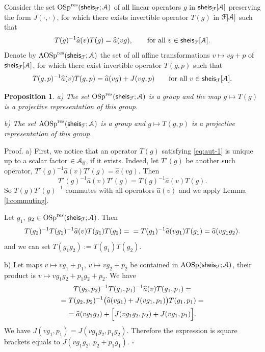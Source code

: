 \documentclass[]{amsart}
\newtheorem{proposition}[theorem]{Proposition}
\def\OSp{\mathrm {OSp}}
\def\cA{\EuScript A}
\def\cF{\EuScript F}
\def\ov{\overline}
\def\wh{\widehat}
\def\sm{\smallskip}
\def\0{{\ov 0}}
\def\sheis{\mathsf{sheis}}
\begin{document}
 Consider the set $\OSp^{\mathrm{res}}(\sheis_\cF;\cA)$ of all linear operators $g$ in $\sheis_\cF[\cA]$
 preserving the form $J(\cdot,\cdot)$, for which there exists 
 invertible operator $T(g)$ in $\cF[\cA]$ such that
 \begin{equation}
 T(g)^{-1}\wh a(v) T(g)= \wh a (vg), \qquad \text{for all $v\in \sheis_\cF[\cA]$.}
 \label{eq:aut-1}
 \end{equation}
 Denote by $\mathrm{AOSp}^{\mathrm{res}}(\sheis_\cF;\cA)$ the set of all
 affine transformations $v\mapsto vg+ p$ of $\sheis_\cF[\cA]$, for which
 there exist invertible operator $T(g,p)$ such that
 \begin{equation}
 T(g,p)^{-1} \wh a(v)  T(g,p)=\wh a(vg)+ J(vg, p)
  \qquad \text{for all $v\in \sheis_\cF[\cA]$.}
  \label{eq:aut-2}
\end{equation}
 
 \begin{proposition}
 {\rm a)}	The set
$\OSp^{\mathrm{res}}(\sheis_\cF;\cA)$ is a group and the map
$g\mapsto T(g)$ is a projective representation of this group.

\sm

{\rm b)} The set $\mathrm{AOSp}^{\mathrm{res}}(\sheis_\cF;\cA)$
is a group  and $g\mapsto T(g,p)$ is a projective representation
of this group.
\end{proposition}

{\sc Proof.} a) First, we notice that an operator $T(g)$ satisfying
\eqref{eq:aut-1} is unique up to a scalar
factor $\in\cA_\0$, if it exists. Indeed, let $T'(g)$
be another such operator, $ T'(g)^{-1}\wh a(v) T'(g)= \wh a (vg)$.
Then
$$
 T'(g)^{-1}\wh a(v) T'(g)=  T(g)^{-1}\wh a(v) T(g).
$$ 
So $T(g)T'(g)^{-1}$ commutes with all operators $\wh a(v)$
and we apply Lemma \ref{l:commuting}.

 Let $g_1$, $g_2\in \OSp^{\mathrm{res}}(\sheis_\cF;\cA)$.
Then
\begin{equation*}
T(g_2)^{-1}T(g_1)^{-1}\wh a (v) T(g_1)T(g_2)=\\=
T(g_1)^{-1}\wh a (vg_1) T(g_1)=\wh a(vg_1g_2).
\end{equation*}
and we can set $T(g_1 g_2):=T(g_1)T(g_2)$. 

\sm 

b) Let maps $v\mapsto v g_1+p_1$, $v\mapsto v g_2+p_2$
be contained in $\mathrm{AOSp}(\sheis_\cF;\cA)$, their product
is $v\mapsto vg_1g_2 + p_1g_2+p_2$. We have
\begin{multline*}
T(g_2,p_2)^{-1}T(g_1,p_1)^{-1}\wh a (v) T(g_1,p_1)=\\=
T(g_2,p_2)^{-1}\bigl(\wh a(vg_1)+J(vg_1,p_1)\bigr)T(g_1,p_1)
=\\=
\wh a(vg_1g_2)+ \Bigl[J(vg_1g_2,p_2)+J(vg_1,p_1)\Bigr].
\end{multline*}
We have $J(v g_1,p_1)=J(v g_1g_2,p_1g_2)$. Therefore the expression
is square brackets equals to $J(vg_1g_2,\,p_2+p_1 g_1)$.
\hfill $\square$
\end{document}
